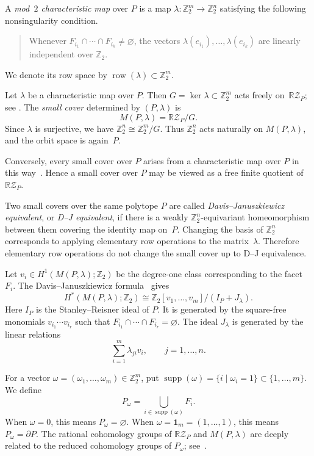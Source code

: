 \documentclass{amsart}
\numberwithin{equation}{section}
\theoremstyle{definition}
\theoremstyle{remark}
\newcommand{\Z}{\mathbb Z}
\newcommand{\RZ}{\mathbb R\mathcal Z}
\newcommand{\one}{\mathbf 1}
\DeclareMathOperator{\supp}{supp}
\DeclareMathOperator{\row}{row}
\begin{document}
A \emph{mod~$2$ characteristic map} over $P$ is a map $\lambda\colon \Z_2^m \to \Z_2^n$ satisfying the following nonsingularity condition.
\begin{quote}
    Whenever $F_{i_1}\cap\cdots\cap F_{i_k}\neq\varnothing$, the vectors $\lambda(e_{i_1}),\ldots,\lambda(e_{i_k})$ are linearly independent over $\Z_2$.
\end{quote}
We denote its row space by $\row(\lambda)\subset \Z_2^m$.

Let $\lambda$ be a characteristic map over $P$.
Then $G=\ker\lambda \subset \Z_2^m$ acts freely on~$\RZ_P$; see \cite[Lemma~3.1]{Choi-Kaji-Theriault2017}.
The \emph{small cover} determined by $(P,\lambda)$ is 
$$
    M(P,\lambda) = \RZ_P/G.  
$$
Since $\lambda$ is surjective, we have $\Z_2^n \cong \Z_2^m / G$.
Thus $\Z_2^n$ acts naturally on $M(P,\lambda)$, and the orbit space is again~$P$.

Conversely, every small cover over $P$ arises from a characteristic map over $P$ in this way~\cite{Davis-Januszkiewicz1991}.
Hence a small cover over $P$ may be viewed as a free finite quotient of~$\RZ_P$.
 
Two small covers over the same polytope $P$ are called \emph{Davis--Januszkiewicz equivalent}, or \emph{D--J equivalent}, if there is a weakly $\Z_2^n$-equivariant homeomorphism between them covering the identity map on~$P$.
Changing the basis of $\Z_2^n$ corresponds to applying elementary row operations to the matrix~$\lambda$.
Therefore elementary row operations do not change the small cover up to D--J equivalence.

Let $v_i\in H^1(M(P,\lambda);\Z_2)$ be the degree-one class corresponding to the facet $F_i$.
The Davis--Januszkiewicz formula~\cite{Davis-Januszkiewicz1991} gives 
\begin{equation}\label{eq:mod2cohom_smallcover}
    H^\ast(M(P,\lambda);\Z_2) \cong \Z_2[v_1,\ldots,v_m]/(I_P+J_\lambda).
\end{equation}
Here $I_P$ is the Stanley--Reisner ideal of $P$.
It is generated by the square-free monomials $v_{i_1}\cdots v_{i_r}$ such that $F_{i_1}\cap\cdots\cap F_{i_r}=\varnothing$.
The ideal $J_\lambda$ is generated by the linear relations
$$
    \sum_{i=1}^m \lambda_{ji}v_i, \qquad j=1,\ldots,n.
$$

For a vector $\omega = (\omega_1, \ldots, \omega_m) \in \Z_2^m$, put $\supp(\omega) = \{i \mid \omega_i =1\} \subset \{ 1, \ldots, m\}$.
We define 
$$
    P_\omega = \bigcup_{i \in \supp(\omega)} F_i.
$$
When $\omega = 0$, this means $P_\omega = \varnothing$.
When $\omega=\one_m = (1,\ldots,1)$, this means $P_\omega = \partial P$.
The rational cohomology groups of $\RZ_P$ and $M(P,\lambda)$ are deeply related to the reduced cohomology groups of $P_\omega$; see~\cite{Choi-Park2020}.
\end{document}
